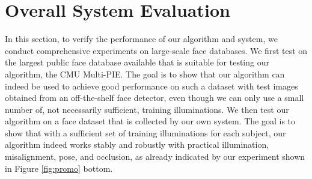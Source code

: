 \documentclass[10pt,twocolumn,letterpaper]{article}
\begin{document}


\section{Overall System Evaluation}\label{sec:experiment}\vspace{-2mm}
In this section, to verify the performance of our algorithm and system, we conduct comprehensive experiments on large-scale face databases. We first test on the largest public face database available that is suitable for testing our algorithm, the CMU Multi-PIE. The goal is to show that our algorithm can indeed be used to achieve good performance on such a dataset with test images obtained from an off-the-shelf face detector, even though we can only use a small number of, not necessarily sufficient, training illuminations. We then test our algorithm on a face dataset that is collected by our own system. The goal is to show that with a sufficient set of training illuminations for each subject, our algorithm indeed works stably and robustly with practical illumination, misalignment, pose, and occlusion, as already indicated by our experiment shown in Figure \ref{fig:promo} bottom.
\end{document}
